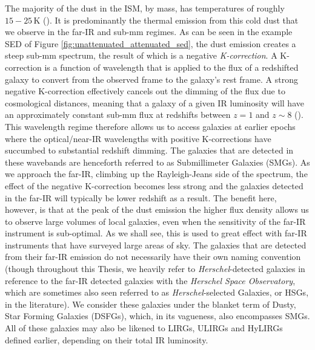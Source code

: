 The majority of the dust in the ISM, by mass, has temperatures of roughly $15 - 25\,$K (\citealt{daCunha_2008}). It is predominantly the thermal emission from this cold dust that we observe in the far-IR and sub-mm regimes. As can be seen in the example SED of Figure \ref{fig:unattenuated_attenuated_sed}, the dust emission creates a steep sub-mm spectrum, the result of which is a negative \textit{K-correction}. A K-correction is a function of wavelength that is applied to the flux of a redshifted galaxy to convert from the observed frame to the galaxy's rest frame. A strong negative K-correction effectively cancels out the dimming of the flux due to cosmological distances, meaning that a galaxy of a given IR luminosity will have an approximately constant sub-mm flux at redshifts between $z = 1$ and $z\sim8$ (\citealt{Casey_2014b}). This wavelength regime therefore allows us to access galaxies at earlier epochs where the optical/near-IR wavelengths with positive K-corrections have succumbed to substantial redshift dimming. The galaxies that are detected in these wavebands are henceforth referred to as Submillimeter Galaxies (SMGs). As we approach the far-IR, climbing up the Rayleigh-Jeans side of the spectrum, the effect of the negative K-correction becomes less strong and the galaxies detected in the far-IR will typically be lower redshift as a result. The benefit here, however, is that at the peak of the dust emission the higher flux density allows us to observe large volumes of local galaxies, even when the sensitivity of the far-IR instrument is sub-optimal. As we shall see, this is used to great effect with far-IR instruments that have surveyed large areas of sky. The galaxies that are detected from their far-IR emission do not necessarily have their own naming convention (though throughout this Thesis, we heavily refer to \textit{Herschel}-detected galaxies in reference to the far-IR detected galaxies with the \textit{Herschel Space Observatory}, which are sometimes also seen referred to as \textit{Herschel}-selected Galaxies, or HSGs, in the literature). We consider these galaxies under the blanket term of Dusty, Star Forming Galaxies (DSFGs), which, in its vagueness, also encompasses SMGs. All of these galaxies may also be likened to LIRGs, ULIRGs and HyLIRGs defined earlier, depending on their total IR luminosity.

